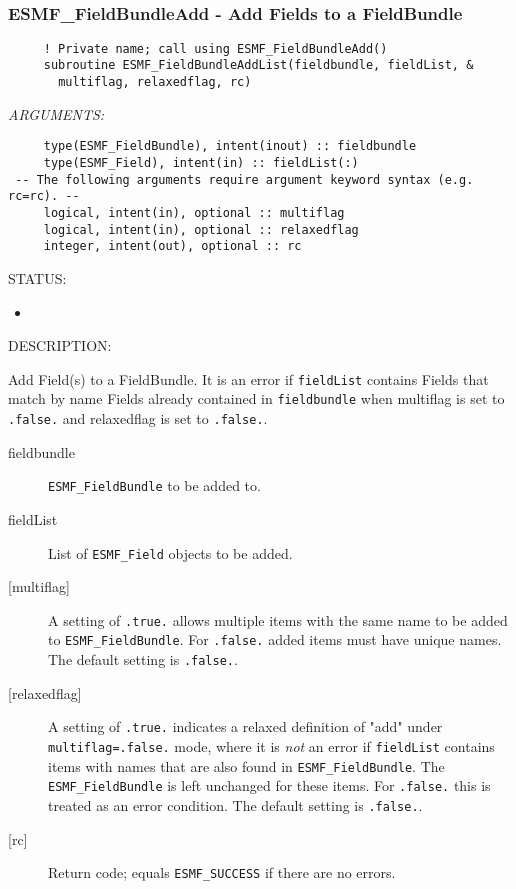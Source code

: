  
\mbox{}\hrulefill\ 
 
\subsubsection [ESMF\_FieldBundleAdd] {ESMF\_FieldBundleAdd - Add Fields to a FieldBundle}


  
\begin{verbatim}     ! Private name; call using ESMF_FieldBundleAdd()
     subroutine ESMF_FieldBundleAddList(fieldbundle, fieldList, &
       multiflag, relaxedflag, rc)\end{verbatim}{\em ARGUMENTS:}
\begin{verbatim}     type(ESMF_FieldBundle), intent(inout) :: fieldbundle
     type(ESMF_Field), intent(in) :: fieldList(:)
 -- The following arguments require argument keyword syntax (e.g. rc=rc). --
     logical, intent(in), optional :: multiflag
     logical, intent(in), optional :: relaxedflag
     integer, intent(out), optional :: rc\end{verbatim}
{\sf STATUS:}
   \begin{itemize}
   \item{}
   \end{itemize}
  
{\sf DESCRIPTION:\\ }


   Add Field(s) to a FieldBundle. It is an error if {\tt fieldList} contains
   Fields that match by name Fields already contained in
   {\tt fieldbundle} when multiflag
   is set to {\tt .false.} and relaxedflag is set to {\tt .false.}.
  
   \begin{description}
   \item [fieldbundle]
   {\tt ESMF\_FieldBundle} to be added to.
   \item [fieldList]
   List of {\tt ESMF\_Field} objects to be added.
   \item [{[multiflag]}]
   A setting of {\tt .true.} allows multiple items with the same name
   to be added to {\tt ESMF\_FieldBundle}. For {\tt .false.} added items must
   have unique names. The default setting is {\tt .false.}.
   \item [{[relaxedflag]}]
   A setting of {\tt .true.} indicates a relaxed definition of "add"
   under {\tt multiflag=.false.} mode, where it is {\em not} an error if
   {\tt fieldList} contains items with names that are also found in
   {\tt ESMF\_FieldBundle}. The {\tt ESMF\_FieldBundle} is left unchanged for these items.
   For {\tt .false.} this is treated as an error condition.
   The default setting is {\tt .false.}.
   \item [{[rc]}]
   Return code; equals {\tt ESMF\_SUCCESS} if there are no errors.
   \end{description}
   
